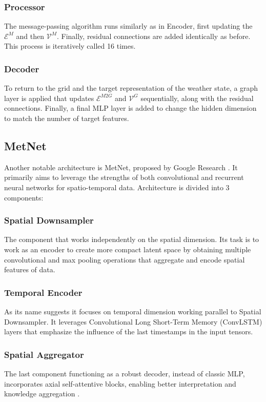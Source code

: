 \subsubsection{Processor}
The message-passing algorithm runs similarly as in Encoder, first updating the $\mathcal{E}^M$ and then $\mathcal{V}^M$. Finally, residual connections are added identically as before. This process is iteratively called 16 times. \\

\subsubsection{Decoder}
To return to the grid and the target representation of the weather state, a graph layer is applied that updates $\mathcal{E}^{M2G}$ and $\mathcal{V}^G$ sequentially, along with the residual connections. Finally, a final MLP layer is added to change the hidden dimension to match the number of target features. \\

\subsection{MetNet}
Another notable architecture is MetNet, proposed by Google Research \cite{DBLP:journals/corr/abs-2003-12140}. It primarily aims to leverage the strengths of both convolutional and recurrent neural networks for spatio-temporal data. Architecture is divided into 3 components:
\subsubsection{Spatial Downsampler}
The component that works independently on the spatial dimension. Its task is to work as an encoder to create more compact latent space by obtaining multiple convolutional and max pooling operations that aggregate and encode spatial features of data.
\subsubsection{Temporal Encoder}
As its name suggests it focuses on temporal dimension working parallel to Spatial Downsampler. It leverages Convolutional Long Short-Term Memory (ConvLSTM) layers that emphasize the influence of the last timestamps in the input tensors. 
\subsubsection{Spatial Aggregator}
The last component functioning as a robust decoder, instead of classic MLP, incorporates axial self-attentive blocks, enabling better interpretation and knowledge aggregation \cite{ho2019axial}. \\

